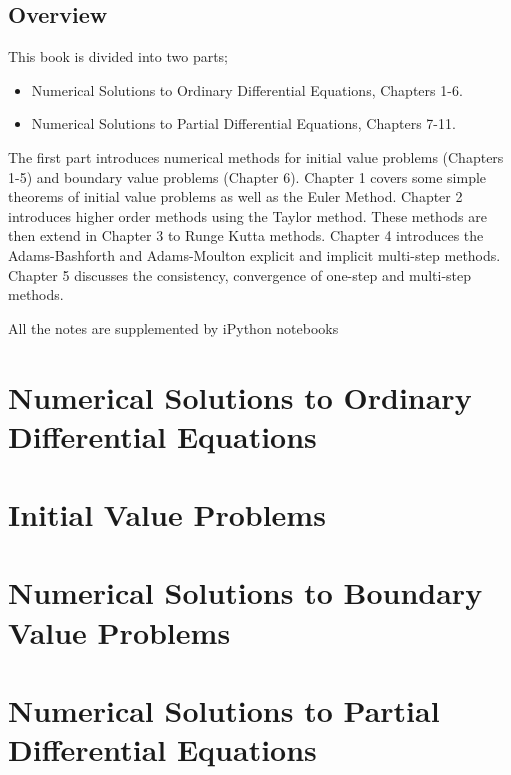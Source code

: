 \documentclass[
  oneside,
  11pt, a4paper,
  footinclude=true,
  headinclude=true,
  cleardoublepage=empty
]{scrbook}
\begin{document}


%

%
\chapter*{Overview}
This book is divided into two parts;
\begin{itemize}
    \item Numerical Solutions to Ordinary Differential Equations, Chapters 1-6.
    \item Numerical Solutions to Partial Differential Equations, Chapters 7-11.
\end{itemize}

The first part introduces numerical methods for initial value problems (Chapters 1-5) and boundary value problems (Chapter 6). Chapter 1 covers some simple theorems of initial value problems as well as the Euler Method.
Chapter 2 introduces higher order methods using the Taylor method.
These methods are then extend in Chapter 3 to Runge Kutta methods.
Chapter 4 introduces the Adams-Bashforth and Adams-Moulton explicit and implicit multi-step methods. Chapter 5 discusses the consistency, convergence of one-step and multi-step methods.


All the notes are supplemented by iPython notebooks 

\part{Numerical Solutions to Ordinary Differential Equations}
\part{Initial Value Problems}







\part{Numerical Solutions to Boundary Value Problems}

\part{Numerical Solutions to Partial Differential Equations}











\printindex
\end{document}

